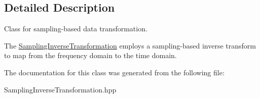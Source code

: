\subsection{Detailed Description}
Class for sampling-\/based data transformation. 

The \hyperlink{classPecos_1_1SamplingInverseTransformation}{Sampling\+Inverse\+Transformation} employs a sampling-\/based inverse transform to map from the frequency domain to the time domain. 

The documentation for this class was generated from the following file\+:\begin{DoxyCompactItemize}
\item 
Sampling\+Inverse\+Transformation.\+hpp\end{DoxyCompactItemize}
